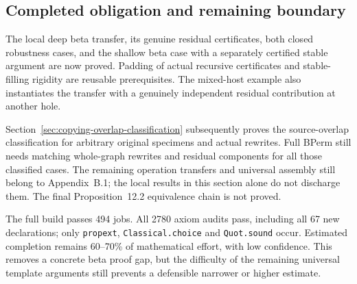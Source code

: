 \subsection{Completed obligation and remaining boundary}
The local deep beta transfer, its genuine residual certificates, both closed
robustness cases, and the shallow beta case with a separately certified
stable argument are now proved. Padding of actual recursive certificates and
stable-filling rigidity are reusable prerequisites. The mixed-host example
also instantiates the transfer with a genuinely independent residual
contribution at another hole.

Section~\ref{sec:copying-overlap-classification} subsequently proves the
source-overlap classification for arbitrary original specimens and actual
rewrites. Full BPerm still needs matching whole-graph rewrites and residual
components for all those classified cases. The remaining operation transfers
and universal assembly still belong to Appendix~B.1; the local results in this
section alone do not discharge them.
The final Proposition~12.2 equivalence chain is not proved.

The full build passes 494 jobs. All 2780 axiom audits pass, including all
67 new declarations; only \texttt{propext}, \texttt{Classical.choice} and
\texttt{Quot.sound} occur. Estimated completion remains 60--70\% of
mathematical effort, with low confidence. This removes a concrete beta proof
gap, but the difficulty of the remaining universal template arguments still
prevents a defensible narrower or higher estimate.
